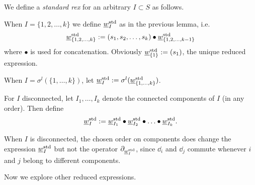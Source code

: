 
\begin{defn}\label{defn-standard rex}
We define a \emph{standard rex}  for an arbitrary $I \subset S$ as follows.

When $I = \{1, 2, \ldots, k\}$ we define $\underline{w}_I^{\operatorname{std}}$ as in the previous lemma, i.e.
\begin{equation}  \underline{w}_{\{1, 2, \ldots,k\}}^{\operatorname{std}}:=(s_1,s_2,\ldots ,s_k)\bullet \underline{w}^{\operatorname{std}}_{\{1,2, \ldots,k-1\}} \end{equation}
    where $\bullet$ is used for concatenation. Obviously $\underline{w}_{\{1\}}^{\operatorname{std}}:=(s_1)$, the unique reduced expression.

When $I = \sigma^{l}(\{1, \ldots, k\})$, let $\underline{w}_I^{\operatorname{std}} := \sigma^l(\underline{w}_{\{1, \ldots, k\}}^{\operatorname{std}})$.

For $I$ disconnected,  let $I_1, \ldots, I_k$ denote the connected components of $I$ (in any order). Then define
\begin{equation} \underline{w}_I^{\operatorname{std}} := \underline{w}_{I_1}^{\operatorname{std}}\bullet \underline{w}_{I_2}^{\operatorname{std}} \bullet \ldots \bullet \underline{w}_{I_k}^{\operatorname{std}}. \end{equation}

\end{defn}

\begin{remark}
When $I$ is disconnected, the chosen order on components does change the expression $\underline{w}_I^{\operatorname{std}}$ but not the operator $\partial_{\underline{w}_I^{\operatorname{std}}}$, since $\dd_i$ and $\dd_j$ commute whenever $i$ and $j$ belong to different components.

\end{remark}

    Now we explore other reduced expressions.
    

